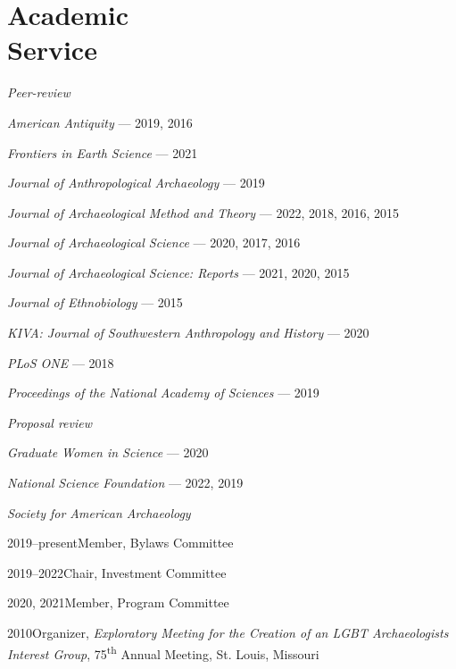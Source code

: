 \section{Academic \\ Service}

\emph{Peer-review}
\begin{list1}
\item[] \emph{American Antiquity} — 2019, 2016
\item[] \emph{Frontiers in Earth Science} — 2021
\item[] \emph{Journal of Anthropological Archaeology} — 2019
\item[] \emph{Journal of Archaeological Method and Theory} — 2022, 2018, 2016, 2015
\item[] \emph{Journal of Archaeological Science} — 2020, 2017, 2016 
\item[] \emph{Journal of Archaeological Science: Reports} — 2021, 2020, 2015 
\item[] \emph{Journal of Ethnobiology} — 2015
\item[] \emph{KIVA: Journal of Southwestern Anthropology and History} — 2020
\item[] \emph{PLoS ONE} — 2018
\item[] \emph{Proceedings of the National Academy of Sciences} — 2019
\end{list1}

\newpage
\emph{Proposal review}
\begin{list1}
\item[] \emph{Graduate Women in Science} — 2020
\item[] \emph{National Science Foundation} — 2022, 2019
\end{list1}

\emph{Society for American Archaeology}
\begin{list1}
\item[] 2019–present\hspace{.2cm}Member, Bylaws Committee
\item[] 2019–2022\hspace{.2cm}Chair, Investment Committee
\item[] 2020, 2021\hspace{.2cm}Member, Program Committee
\item[] 2010\hspace{.2cm}Organizer, \emph{Exploratory Meeting for the Creation of an LGBT Archaeologists Interest Group}, 75\textsuperscript{th} Annual Meeting, St. Louis, Missouri
\end{list1}

